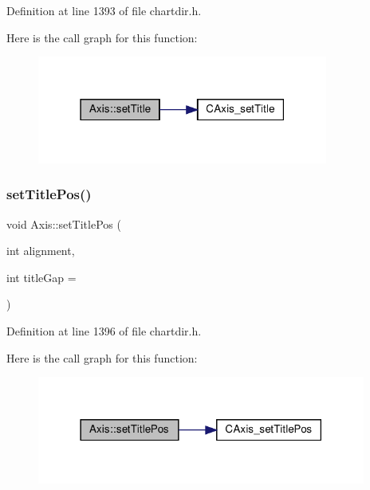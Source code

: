 Definition at line 1393 of file chartdir.\+h.

Here is the call graph for this function\+:
\nopagebreak
\begin{figure}[H]
\begin{center}
\leavevmode
\includegraphics[width=271pt]{class_axis_ac18e569a6c1b55500ed72c31dd516db7_cgraph}
\end{center}
\end{figure}
\mbox{\label{class_axis_a77d098820ddd2387bab8db649a6d3fc3}} 
\subsubsection{\texorpdfstring{set\+Title\+Pos()}{setTitlePos()}}
{\footnotesize\ttfamily void Axis\+::set\+Title\+Pos (\begin{DoxyParamCaption}\item[{int}]{alignment,  }\item[{int}]{title\+Gap = {} }\end{DoxyParamCaption})\hspace{0.3cm}{\ttfamily [inline]}}



Definition at line 1396 of file chartdir.\+h.

Here is the call graph for this function\+:
\nopagebreak
\begin{figure}[H]
\begin{center}
\leavevmode
\includegraphics[width=306pt]{class_axis_a77d098820ddd2387bab8db649a6d3fc3_cgraph}
\end{center}
\end{figure}
\mbox{\label{class_axis_a05d760c8d314d23ba72ca69bf1382186}} 
